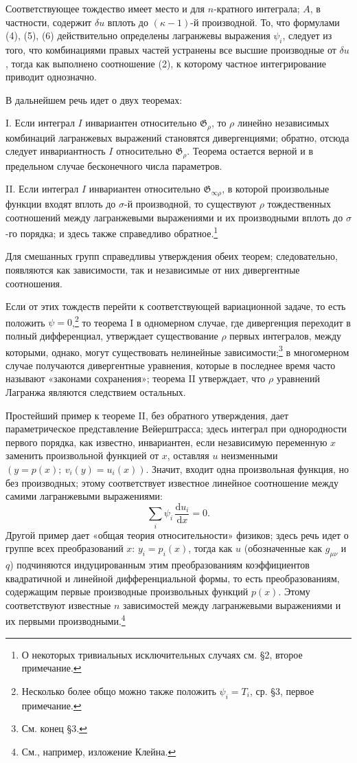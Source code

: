 \documentclass[11pt]{article}
\providecommand{\G}{\mathfrak G}
\providecommand{\dd}{\mathrm d}
\begin{document}
Соответствующее тождество имеет место и для \(n\)-кратного интеграла; \(A\), в частности, содержит \(\delta u\) вплоть до \((\kappa-1)\)-й производной. То, что формулами (4), (5), (6) действительно определены лагранжевы выражения \(\psi_i\), следует из того, что комбинациями правых частей устранены все высшие производные от \(\delta u\), тогда как выполнено соотношение (2), к которому частное интегрирование приводит однозначно.

В дальнейшем речь идет о двух теоремах:

I. Если интеграл \(I\) инвариантен относительно \(\G_\rho\), то \(\rho\) линейно независимых комбинаций лагранжевых выражений становятся дивергенциями; обратно, отсюда следует инвариантность \(I\) относительно \(\G_\rho\). Теорема остается верной и в предельном случае бесконечного числа параметров.

II. Если интеграл \(I\) инвариантен относительно \(\G_{\infty\rho}\), в которой произвольные функции входят вплоть до \(\sigma\)-й производной, то существуют \(\rho\) тождественных соотношений между лагранжевыми выражениями и их производными вплоть до \(\sigma\)-го порядка; и здесь также справедливо обратное.\footnote{О некоторых тривиальных исключительных случаях см. \S{}2, второе примечание.}

Для смешанных групп справедливы утверждения обеих теорем; следовательно, появляются как зависимости, так и независимые от них дивергентные соотношения.

Если от этих тождеств перейти к соответствующей вариационной задаче, то есть положить \(\psi=0\),\footnote{Несколько более общо можно также положить \(\psi_i=T_i\), ср. \S{}3, первое примечание.} то теорема I в одномерном случае, где дивергенция переходит в полный дифференциал, утверждает существование \(\rho\) первых интегралов, между которыми, однако, могут существовать нелинейные зависимости;\footnote{См. конец \S{}3.} в многомерном случае получаются дивергентные уравнения, которые в последнее время часто называют «законами сохранения»; теорема II утверждает, что \(\rho\) уравнений Лагранжа являются следствием остальных.

Простейший пример к теореме II, без обратного утверждения, дает параметрическое представление Вейерштрасса; здесь интеграл при однородности первого порядка, как известно, инвариантен, если независимую переменную \(x\) заменить произвольной функцией от \(x\), оставляя \(u\) неизменными \((y=p(x);\ v_i(y)=u_i(x))\). Значит, входит одна произвольная функция, но без производных; этому соответствует известное линейное соотношение между самими лагранжевыми выражениями:
\[
\sum_i \psi_i\,\frac{\dd u_i}{\dd x}=0.
\]
Другой пример дает «общая теория относительности» физиков; здесь речь идет о группе всех преобразований \(x\): \(y_i=p_i(x)\), тогда как \(u\) (обозначенные как \(g_{\mu\nu}\) и \(q\)) подчиняются индуцированным этим преобразованиям коэффициентов квадратичной и линейной дифференциальной формы, то есть преобразованиям, содержащим первые производные произвольных функций \(p(x)\). Этому соответствуют известные \(n\) зависимостей между лагранжевыми выражениями и их первыми производными.\footnote{См., например, изложение Клейна.}
\end{document}
